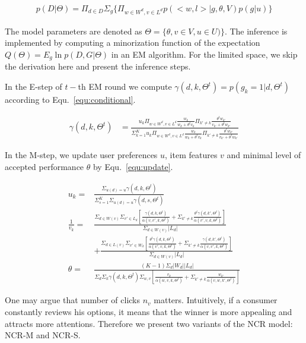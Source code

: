 \documentclass[sigconf]{acmart}
\begin{document}
\begin{align}\label{equ:likelihood}
		p(D|\Theta)=\Pi_{d\in D} \Sigma_{g} \{\Pi_{w\in W^d, v\in L^d} p(<w,l>|g,\theta,V) p(g|u)\}
\end{align}

The model parameters are denoted as $\Theta=\{\theta,v\in V, u\in U)\}$.  The inference is implemented by computing a minorization function of the expectation $Q(\Theta)=E_g \ln p(D,G|\Theta) $ in an EM algorithm. For the limited space, we skip the derivation here and present the inference steps. 

In the E-step of $t-$th  EM round we compute $\gamma(d,k,\Theta^t)=p(g_k=1|d,\Theta^t)$ according to Equ.~\ref{equ:conditional}.

\begin{align}\label{equ:conditional}
\gamma(d,k,\Theta^t) &=\frac{u_k \Pi_{w \in W^d, v\in L^d} \frac{w_k}{w_k+\theta^t v_k}\Pi_{k'\neq k}\frac{\theta^t w_{k'}}{v_{k'}+\theta^t w_{k'}}}{\Sigma_{k=1}^K u_k \Pi_{w \in W^d, v\in L^d} \frac{w_k}{w_k+\theta^t v_k}\Pi_{k'\neq k}\frac{\theta^t w_{k'}}{v_{k'}+\theta^t w_{k'}}}
\end{align}

In the M-step, we update user preferences $u$, item features $v$ and minimal level of accepted performance $\theta$ by Equ.~\ref{equ:update}. 

\begin{align}\label{equ:update}
u_k = & \frac{\Sigma_{u(d)=u}\gamma(d,k,\Theta^t)}{\Sigma_{s=1}^K \Sigma_{u(d)=u}\gamma(d,s,\Theta^t)} \\\nonumber
\frac{1}{v_k}= &\frac{\Sigma_{d\in W(v)}\Sigma_{v'\in L_d} [\frac{\gamma(d,k,\Theta^t)}{ \alpha(v,v',k,\Theta^t)} +\Sigma_{k'\neq k}\frac{\theta^t\gamma(d,k',\Theta^t)}{\alpha(v',v,k,\Theta^t)}]}{\Sigma_{d\in W(v)}|L_d|}\\\nonumber
 & + \frac{\Sigma_{d\in L(v)}\Sigma_{v'\in W_d} [\frac{\theta^t \gamma(d,k,\Theta^t)}{\alpha(v',v,k,\Theta^t)}+\Sigma_{k'\neq k} \frac{\gamma(d,k',\Theta^t)}{\alpha(v,v',k,\Theta^t)}] }{\Sigma_{d\in W(v)}|L_d|}\\\nonumber
\theta = & \frac{(K-1)\Sigma_d |W_d| |L_d|}{\Sigma_d \Sigma_k \gamma(d,k,\Theta^t)\Sigma_{w,v} [\frac{v_k}{\alpha(w,v,k,\Theta^t)}+\Sigma_{k'\neq k} \frac{w_{k'}}{\alpha(v,w,k',\Theta^t)}]}
\end{align}

One may argue that number of clicks $n_v$ matters. Intuitively, if a consumer constantly reviews his options, it means that the winner is more appealing and attracts more attentions. Therefore we present two variants of the NCR model: NCR-M and NCR-S.
\end{document}
